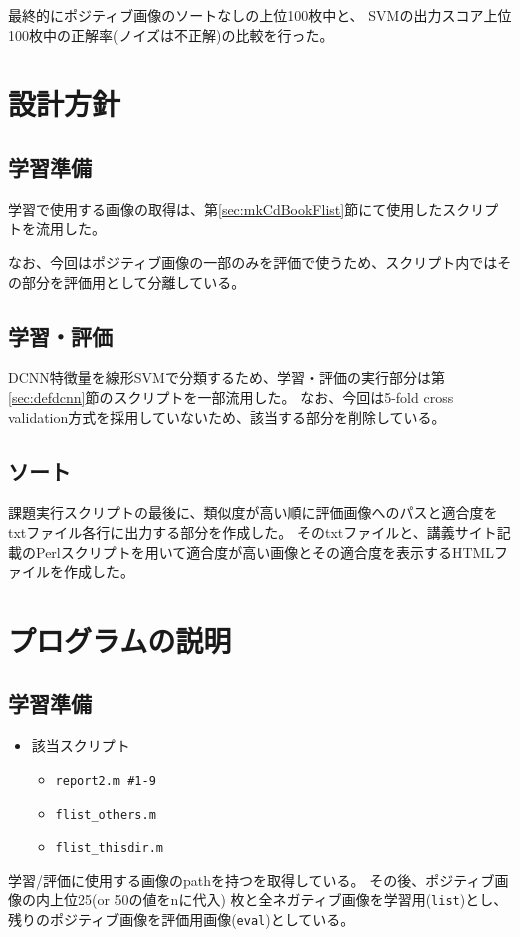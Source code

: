 \documentclass[11pt,a4paper, uplatex]{jsreport}
\begin{document}
最終的にポジティブ画像のソートなしの上位100枚中と、
SVMの出力スコア上位100枚中の正解率(ノイズは不正解)の比較を行った。
\section{設計方針}
\subsection{学習準備}
学習で使用する画像の取得は、第\ref{sec:mkCdBookFlist}節にて使用したスクリプトを流用した。

なお、今回はポジティブ画像の一部のみを評価で使うため、スクリプト内ではその部分を評価用として分離している。
\subsection{学習・評価}
DCNN特徴量を線形SVMで分類するため、学習・評価の実行部分は第\ref{sec:defdcnn}節のスクリプトを一部流用した。
なお、今回は5-fold cross validation方式を採用していないため、該当する部分を削除している。
\subsection{ソート}
課題実行スクリプトの最後に、類似度が高い順に評価画像へのパスと適合度をtxtファイル各行に出力する部分を作成した。
そのtxtファイルと、講義サイト記載のPerlスクリプト\cite{kougi}を用いて適合度が高い画像とその適合度を表示するHTMLファイルを作成した。
\section{プログラムの説明}
\subsection{学習準備}
\begin{itemize}
  \item 該当スクリプト
  \begin{itemize}
    \item \texttt{report2.m \#1-9}
    \item \texttt{flist_others.m}
    \item \texttt{flist_thisdir.m}
  \end{itemize}
\end{itemize}
学習/評価に使用する画像のpathを持つを取得している。
その後、ポジティブ画像の内上位25(or 50の値をnに代入)
枚と全ネガティブ画像を学習用(\texttt{list})とし、
残りのポジティブ画像を評価用画像(\texttt{eval})としている。
\end{document}
